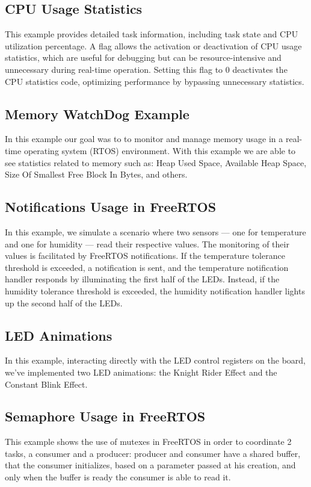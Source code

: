\subsection{CPU Usage Statistics}
This example provides detailed task information, including task state and CPU utilization percentage. A flag allows the activation or deactivation of CPU usage statistics, which are useful for debugging but can be resource-intensive and unnecessary during real-time operation. Setting this flag to 0 deactivates the CPU statistics code, optimizing performance by bypassing unnecessary statistics.

\subsection{Memory WatchDog Example} %
In this example our goal was to to monitor and manage memory usage in a real-time operating system (RTOS) environment. With this example we are able to see statistics related to memory such as: Heap Used Space, Available Heap Space, Size Of Smallest Free Block In Bytes, and others.

\subsection{Notifications Usage in FreeRTOS}
In this example, we simulate a scenario where two sensors — one for temperature and one for humidity — read their respective values.
The monitoring of their values is facilitated by FreeRTOS notifications.
If the temperature tolerance threshold is exceeded, a notification is sent, and the temperature notification handler responds by illuminating the first half of the LEDs.
Instead, if the humidity tolerance threshold is exceeded, the humidity notification handler lights up the second half of the LEDs.

\subsection{LED Animations}
In this example, interacting directly with the LED control registers on the board, we've implemented two LED animations: the Knight Rider Effect and the Constant Blink Effect.

\subsection{Semaphore Usage in FreeRTOS}
This example shows the use of mutexes in FreeRTOS in order to coordinate 2 tasks, a consumer and a producer: producer and consumer have a shared buffer, that the consumer initializes, based on a parameter passed at his creation, and only when the buffer is ready the consumer is able to read it.

